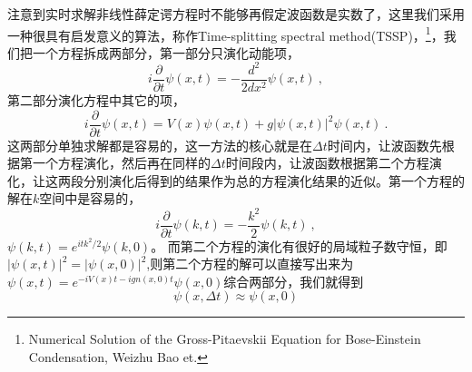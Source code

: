 注意到实时求解非线性薛定谔方程时不能够再假定波函数是实数了，这里我们采用一种很具有启发意义的算法，称作Time-splitting spectral method(TSSP)，\footnote{Numerical Solution of the Gross-Pitaevskii Equation for Bose-Einstein Condensation, Weizhu Bao et.}，我们把一个方程拆成两部分，第一部分只演化动能项，
\begin{equation}
i\frac{\partial}{\partial t} \psi(x,t) = -\frac{d^2}{2dx^2} \psi(x,t)~,
\end{equation}
第二部分演化方程中其它的项，
\begin{equation}
i\frac{\partial}{\partial t}\psi(x,t) = V(x)\psi(x,t) + g |\psi(x,t)|^2\psi(x,t) ~.
\end{equation}
这两部分单独求解都是容易的，这一方法的核心就是在$\Delta t$时间内，让波函数先根据第一个方程演化，然后再在同样的$\Delta t$时间段内，让波函数根据第二个方程演化，让这两段分别演化后得到的结果作为总的方程演化结果的近似。第一个方程的解在$k$空间中是容易的，
\begin{equation}
i\frac{\partial}{\partial t}\psi(k,t) = -\frac{k^2}{2}\psi(k,t) ~,
\end{equation}
$\psi(k,t) = e^{itk^2/2}\psi(k,0)$。 而第二个方程的演化有很好的局域粒子数守恒，即$|\psi(x,t)|^2 = |\psi(x,0)|^2$,则第二个方程的解可以直接写出来为$\psi(x,t) = e^{-iV(x)t-ig n(x,0)t}\psi(x,0)$综合两部分，我们就得到
\begin{equation}
\psi(x,\Delta t) \approx \psi(x,0)
\end{equation}

